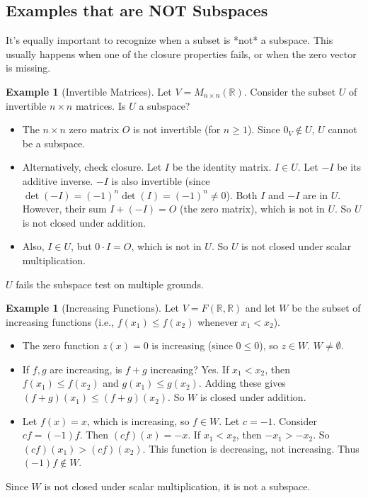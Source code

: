 \documentclass[11pt]{article}
\theoremstyle{definition}
\newtheorem{example}[theorem]{Example}
\newcommand{\R}{\mathbb{R}}
\newcommand{\M}[2]{M_{#1 \times #2}}
\begin{document}
\subsection{Examples that are NOT Subspaces}

It's equally important to recognize when a subset is *not* a subspace. This usually happens when one of the closure properties fails, or when the zero vector is missing.

\begin{example}[Invertible Matrices]
Let $V = \M{n}{n}(\R)$. Consider the subset $U$ of invertible $n \times n$ matrices. Is $U$ a subspace?
\begin{itemize}
    \item The $n \times n$ zero matrix $O$ is not invertible (for $n \ge 1$). Since $0_V \notin U$, $U$ cannot be a subspace.
    \item Alternatively, check closure. Let $I$ be the identity matrix. $I \in U$. Let $-I$ be its additive inverse. $-I$ is also invertible (since $\det(-I) = (-1)^n \det(I) = (-1)^n \neq 0$). Both $I$ and $-I$ are in $U$. However, their sum $I + (-I) = O$ (the zero matrix), which is not in $U$. So $U$ is not closed under addition.
    \item Also, $I \in U$, but $0 \cdot I = O$, which is not in $U$. So $U$ is not closed under scalar multiplication.
\end{itemize}
$U$ fails the subspace test on multiple grounds.
\end{example}

\begin{example}[Increasing Functions]
Let $V = F(\R, \R)$ and let $W$ be the subset of increasing functions (i.e., $f(x_1) \le f(x_2)$ whenever $x_1 < x_2$).
\begin{itemize}
    \item The zero function $z(x)=0$ is increasing (since $0 \le 0$), so $z \in W$. $W \neq \emptyset$.
    \item If $f, g$ are increasing, is $f+g$ increasing? Yes. If $x_1 < x_2$, then $f(x_1) \le f(x_2)$ and $g(x_1) \le g(x_2)$. Adding these gives $(f+g)(x_1) \le (f+g)(x_2)$. So $W$ is closed under addition.
    \item Let $f(x) = x$, which is increasing, so $f \in W$. Let $c = -1$. Consider $cf = (-1)f$. Then $(cf)(x) = -x$. If $x_1 < x_2$, then $-x_1 > -x_2$. So $(cf)(x_1) > (cf)(x_2)$. This function is decreasing, not increasing. Thus $(-1)f \notin W$.
\end{itemize}
Since $W$ is not closed under scalar multiplication, it is not a subspace.
\end{example}
\end{document}
